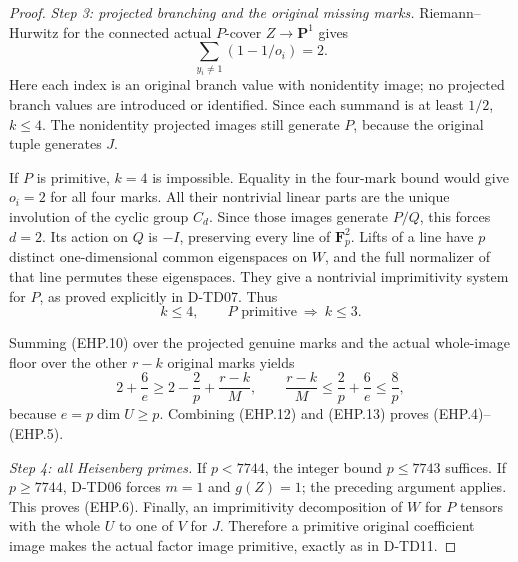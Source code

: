 \begin{proof}
\emph{Step 3: projected branching and the original missing marks.}
Riemann--Hurwitz for the connected actual \(P\)-cover \(Z\to\mathbf P^1\)
gives
\[
                  \sum_{y_i\ne1}(1-1/o_i)=2.
 \tag{EHP.11}
\]
Here each index is an original branch value with nonidentity image;
no projected branch values are introduced or identified.  Since
each summand is at least \(1/2\), \(k\le4\).
The nonidentity projected images still generate \(P\), because
the original tuple generates \(J\).

If \(P\) is primitive, \(k=4\) is impossible.  Equality in the
four-mark bound would give \(o_i=2\) for all four marks.  All their
nontrivial linear parts are the unique involution of the cyclic
group \(C_d\).  Since those images generate \(P/Q\), this forces
\(d=2\).  Its action on \(Q\) is \(-I\), preserving every line of
\(\mathbf F_p^2\).  Lifts of a line have \(p\) distinct one-dimensional
common eigenspaces on \(W\), and the full normalizer of that line
permutes these eigenspaces.  They give a nontrivial imprimitivity
system for \(P\), as proved explicitly in D-TD07.  Thus
\[
                k\le4,\qquad
                P\text{ primitive}\ \Longrightarrow\ k\le3.
 \tag{EHP.12}
\]

Summing (EHP.10) over the projected genuine marks and the actual
whole-image floor over the other \(r-k\) original marks yields
\[
 2+\frac6e
 \ge 2-\frac2p+\frac{r-k}{M},
 \qquad
 \frac{r-k}{M}\le\frac2p+\frac6e\le\frac8p,
 \tag{EHP.13}
\]
because \(e=p\dim U\ge p\).  Combining (EHP.12) and (EHP.13)
proves (EHP.4)--(EHP.5).

\emph{Step 4: all Heisenberg primes.}
If \(p<7744\), the integer bound \(p\le7743\) suffices.
If \(p\ge7744\), D-TD06 forces \(m=1\) and \(g(Z)=1\);
the preceding argument applies.  This proves (EHP.6).
Finally, an imprimitivity decomposition of \(W\) for \(P\) tensors
with the whole \(U\) to one of \(V\) for \(J\).
Therefore a primitive original coefficient image makes the actual
factor image primitive, exactly as in D-TD11.
\end{proof}

